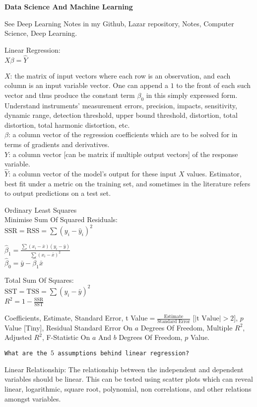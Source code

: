 \newpage

\textbf{Data Science And Machine Learning}

See Deep Learning Notes in my Github, Lazar repository, Notes, Computer Science, Deep Learning.

Linear Regression: \\
$X \beta = \hat{Y}$

$X$: the matrix of input vectors where each row is an observation, and each column is an input variable vector. One can append a $1$ to the front of each such vector and thus produce the constant term $\beta_0$ in this simply expressed form. Understand instruments' measurement errors, precision, impacts, sensitivity, dynamic range, detection threshold, upper bound threshold, distortion, total distortion, total harmonic distortion, etc. \\
$\beta$: a column vector of the regression coefficients which are to be solved for in terms of gradients and derivatives. \\
$Y$: a column vector [can be matrix if multiple output vectors] of the response variable. \\
$\hat{Y}$: a column vector of the model's output for these input $X$ values. Estimator, best fit under a metric on the training set, and sometimes in the literature refers to output predictions on a test set.

Ordinary Least Squares \\
Minimise Sum Of Squared Residuals: \\
$\text{SSR} = \text{RSS} = \sum (y_i-\hat{y}_i)^2$

$\hat{\beta}_1=\frac{\sum (x_i-\bar{x})(y_i-\bar{y})}{\sum (x_i-\bar{x})^2}$ \\
$\hat{\beta}_0=\bar{y}-\hat{\beta}_1 \bar{x}$

Total Sum Of Squares: \\
$\text{SST} = \text{TSS} = \sum (y_i-\bar{y})^2$ \\

$R^2=1-\frac{\text{SSR}}{\text{SST}}$

Coefficients, Estimate, Standard Error, t Value$=\frac{\text{Estimate}}{\text{Standard Error}}$ [$|\text{t Value}|>2$], $p$ Value [Tiny], Residual Standard Error On $a$ Degrees Of Freedom, Multiple $R^2$, Adjusted $R^2$, F-Statistic On $a$ And $b$ Degrees Of Freedom, $p$ Value.

\texttt{What are the $5$ assumptions behind linear regression?}

Linear Relationship: The relationship between the independent and dependent variables should be linear. This can be tested using scatter plots which can reveal linear, logarithmic, square root, polynomial, non correlations, and other relations amongst variables.

